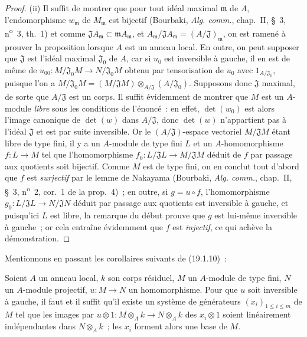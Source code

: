 \begin{proof}
(ii) Il suffit de montrer que pour tout idéal maximal $\mathfrak m$ de $A$,
l'endomorphisme $w_{\mathfrak m}$ de $M_{\mathfrak m}$ est bijectif
(Bourbaki, \emph{Alg. comm.}, chap.~II, §~3, n\textsuperscript{o}~3, th.~1)
et comme $\mathfrak JA_{\mathfrak m}\subset\mathfrak mA_{\mathfrak m}$, et
$A_{\mathfrak m}/\mathfrak JA_{\mathfrak m}=(A/\mathfrak J)_{\mathfrak m}$,
on est ramené à prouver la proposition lorsque $A$ est un anneau local. En
outre, on peut supposer que $\mathfrak J$ est l'idéal maximal
$\mathfrak J_0$ de $A$, car si $u_0$ est inversible
à gauche, il en est de même de
$u_{00}:M/\mathfrak J_0M\to N/\mathfrak J_0M$ obtenu par tensorisation de
$u_0$ avec $1_{A/\mathfrak J_0}$, puisque l'on a
$M/\mathfrak J_0M=(M/\mathfrak JM)\otimes_{A/\mathfrak J}(A/\mathfrak J_0)$.
Supposons donc $\mathfrak J$ maximal, de sorte que $A/\mathfrak J$ est un
corps. Il suffit évidemment de montrer que $M$ est un $A$-module \emph{libre}
sous les conditions de l'énoncé~: en effet, $\det(w_0)$ est alors l'image
canonique de $\det(w)$ dans $A/\mathfrak J$, donc $\det(w)$ n'appartient pas à
l'idéal $\mathfrak J$ et est par suite inversible. Or le
$(A/\mathfrak J)$-espace vectoriel $M/\mathfrak JM$ étant libre de type fini,
il y a un $A$-module de type fini $L$ et un $A$-homomorphisme $f:L\to M$ tel
que l'homomorphisme $f_0:L/\mathfrak JL\to M/\mathfrak JM$ déduit de $f$ par
passage aux quotients soit bijectif. Comme $M$ est de type fini, on en conclut
tout d'abord que $f$ est \emph{surjectif} par le lemme de Nakayama (Bourbaki,
\emph{Alg. comm.}, chap.~II, §~3, n\textsuperscript{o}~2, cor.~1 de la
prop.~4)~; en outre, si $g=u\circ f$, l'homomorphisme
$g_0:L/\mathfrak JL\to N/\mathfrak JN$ déduit par passage aux quotients est
inversible à gauche, et puisqu'ici $L$ est libre, la remarque du début prouve
que $g$ est lui-même inversible à gauche~; or cela entraîne évidemment que
$f$ est \emph{injectif}, ce qui achève la démonstration.
\end{proof}

Mentionnons en passant les corollaires suivants de (19.1.10)~:

\begin{corollary}[19.1.11]
\label{0.19.1.11-fr}
Soient $A$ un anneau local, $k$ son corps résiduel, $M$ un $A$-module de type
fini, $N$ un $A$-module projectif, $u:M\to N$ un homomorphisme. Pour que $u$
soit inversible à gauche, il faut et il suffit qu'il existe un système de
générateurs $(x_i)_{1\leq i\leq m}$ de $M$ tel que les images par
$u\otimes 1:M\otimes_Ak\to N\otimes_Ak$ des $x_i\otimes1$ soient linéairement
indépendantes dans $N\otimes_Ak$~; les $x_i$ forment alors une base de $M$.
\end{corollary}

